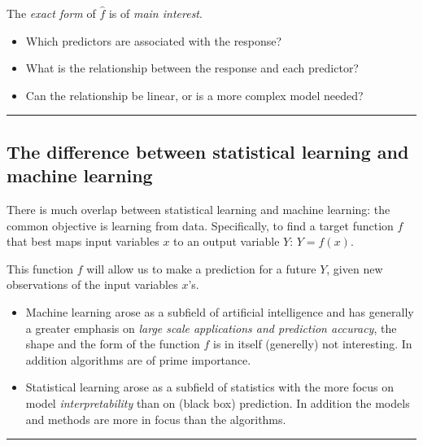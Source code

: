 \documentclass[]{article}
\providecommand{\tightlist}{%
  \setlength{\itemsep}{0pt}\setlength{\parskip}{0pt}}
\begin{document}
The \emph{exact form} of \(\hat{f}\) is of \emph{main interest}.

\begin{itemize}
\tightlist
\item
  Which predictors are associated with the response?
\item
  What is the relationship between the response and each predictor?
\item
  Can the relationship be linear, or is a more complex model needed?
\end{itemize}

\begin{center}\rule{0.5\linewidth}{\linethickness}\end{center}

\hypertarget{the-difference-between-statistical-learning-and-machine-learning}{%
\subsection{The difference between statistical learning and machine
learning}\label{the-difference-between-statistical-learning-and-machine-learning}}

There is much overlap between statistical learning and machine learning:
the common objective is learning from data. Specifically, to find a
target function \(f\) that best maps input variables \(x\) to an output
variable \(Y\): \(Y=f(x)\).

This function \(f\) will allow us to make a prediction for a future
\(Y\), given new observations of the input variables \(x\)'s.

\begin{itemize}
\tightlist
\item
  Machine learning arose as a subfield of artificial intelligence and
  has generally a greater emphasis on \emph{large scale applications and
  prediction accuracy}, the shape and the form of the function \(f\) is
  in itself (generelly) not interesting. In addition algorithms are of
  prime importance.
\item
  Statistical learning arose as a subfield of statistics with the more
  focus on model \emph{interpretability} than on (black box) prediction.
  In addition the models and methods are more in focus than the
  algorithms.
\end{itemize}

\begin{center}\rule{0.5\linewidth}{\linethickness}\end{center}
\end{document}
